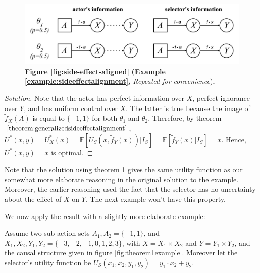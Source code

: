 \begin{figure}[H]
	\centering
	\captionsetup{labelfont=bf,font=small,labelsep=period}
	\includegraphics[width=0.7\linewidth]{"images/examples/1-sideeffect"}
	\caption*{\rightskip=20pt\leftskip=20pt \textbf{Figure \ref{fig:side-effect-aligned}}  \textbf{(Example \ref{example:sideeffectalignment},} \textit{Repeated for convenience})\textbf{.} \examplesideffectalignmentfigurecaption}
\end{figure}
\begin{proof}[Solution]
	Note that the actor has perfect information over $X$, perfect ignorance over $Y$, and has uniform control over $X$. The latter is true because the image of $\tilde f_X(A)$ is equal to $\{-1,1\}$ for both $\theta_1$ and $\theta_2$. Therefore, by theorem $\ref{theorem:generalizedsideeffectalignment}$, $U^*(x,y)=U^*_X(x)=\mathbb E[U_S(x,\tilde f_Y(x))|I_S]=\mathbb E[\tilde f_Y(x)|I_S]=x$. Hence, $U^*(x,y)=x$ is optimal.
\end{proof}

\begin{remark*}
\textnormal{Note that the solution using theorem 1 gives the same utility function as our somewhat more elaborate reasoning in the original solution to the example. Moreover, the earlier reasoning used the fact that the selector has no uncertainty about the effect of $X$ on $Y$. The next example won't have this property.}
\end{remark*}
We now apply the result with a slightly more elaborate example:


\begin{example}\label{example:theorem1example}
	\textnormal	{Assume two sub-action sets $A_1,A_2=\{-1,1\}$, and $X_1,X_2,Y_1,Y_2=\{-3,-2,-1,0,1,2,3\}$, with $X=X_1\times X_2$ and $Y=Y_1\times Y_2$, and the causal structure given in figure \ref{fig:theorem1example}. Moreover let the selector's utility function be $U_S(x_1,x_2,y_1,y_2)=y_1\cdot x_2 + y_2$. 
	}
\end{example}


